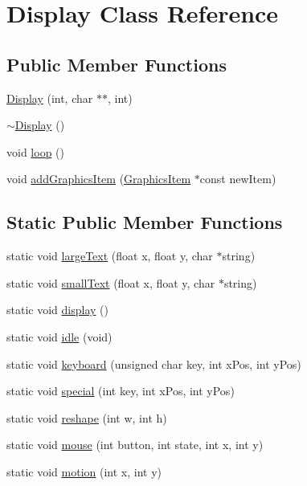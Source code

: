 \hypertarget{classDisplay}{}\section{Display Class Reference}
\label{classDisplay}
\subsection*{Public Member Functions}
\begin{DoxyCompactItemize}
\item 
\hyperlink{classDisplay_a14f0b3465a13c09d9de5b5ed03ca824d}{Display} (int, char $\ast$$\ast$, int)
\item 
\hyperlink{classDisplay_ac2607a6bb236c55547a4223d40d85d1f}{$\sim$\+Display} ()
\item 
void \hyperlink{classDisplay_ab4010e1cfbab001623fb90460102e3ad}{loop} ()
\item 
void \hyperlink{classDisplay_a2374289dfe325db9f908499f7907528a}{add\+Graphics\+Item} (\hyperlink{classGraphicsItem}{Graphics\+Item} $\ast$const new\+Item)
\end{DoxyCompactItemize}
\subsection*{Static Public Member Functions}
\begin{DoxyCompactItemize}
\item 
static void \hyperlink{classDisplay_ae6e3bc9a8a261958251d1c3d6e6f791b}{large\+Text} (float x, float y, char $\ast$string)
\item 
static void \hyperlink{classDisplay_ac62e7e33c27d8c012c3efb8c07f3fc11}{small\+Text} (float x, float y, char $\ast$string)
\item 
static void \hyperlink{classDisplay_aa3ab70ec7b76fa3ed139d19e53e72283}{display} ()
\item 
static void \hyperlink{classDisplay_aee4bd8d62d2911a938523339630a4357}{idle} (void)
\item 
static void \hyperlink{classDisplay_a534c28d5e7287ad3e98106a6d8105e68}{keyboard} (unsigned char key, int x\+Pos, int y\+Pos)
\item 
static void \hyperlink{classDisplay_ad973a37817adac76ae9373dc4f5ba22b}{special} (int key, int x\+Pos, int y\+Pos)
\item 
static void \hyperlink{classDisplay_a655b5e6c69cae3a1b45388448e9064e4}{reshape} (int w, int h)
\item 
static void \hyperlink{classDisplay_a711fdd8ee2c30e8e54d2883ae3e1bbf8}{mouse} (int button, int state, int x, int y)
\item 
static void \hyperlink{classDisplay_a56b5e2138938b063f81e83ad9ed4dae3}{motion} (int x, int y)
\end{DoxyCompactItemize}


